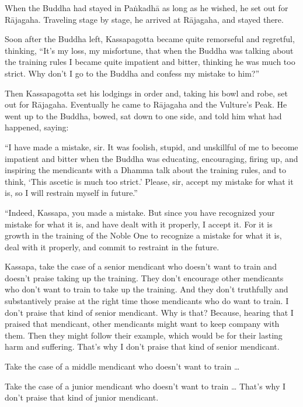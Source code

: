 \documentclass[12pt,openany]{book}%
\begin{document}
When the Buddha had stayed in \textsanskrit{Paṅkadhā} as long as he wished, he set out for \textsanskrit{Rājagaha}. Traveling stage by stage, he arrived at \textsanskrit{Rājagaha}, and stayed there. 

Soon after the Buddha left, Kassapagotta became quite remorseful and regretful, thinking, “It’s my loss, my misfortune, that when the Buddha was talking about the training rules I became quite impatient and bitter, thinking he was much too strict. Why don’t I go to the Buddha and confess my mistake to him?” 

Then Kassapagotta set his lodgings in order and, taking his bowl and robe, set out for \textsanskrit{Rājagaha}. Eventually he came to \textsanskrit{Rājagaha} and the Vulture’s Peak. He went up to the Buddha, bowed, sat down to one side, and told him what had happened, saying: 

“I have made a mistake, sir. It was foolish, stupid, and unskillful of me to become impatient and bitter when the Buddha was educating, encouraging, firing up, and inspiring the mendicants with a Dhamma talk about the training rules, and to think, ‘This ascetic is much too strict.’ Please, sir, accept my mistake for what it is, so I will restrain myself in future.” 

“Indeed, Kassapa, you made a mistake. But since you have recognized your mistake for what it is, and have dealt with it properly, I accept it. For it is growth in the training of the Noble One to recognize a mistake for what it is, deal with it properly, and commit to restraint in the future. 

Kassapa, take the case of a senior mendicant who doesn’t want to train and doesn’t praise taking up the training. They don’t encourage other mendicants who don’t want to train to take up the training. And they don’t truthfully and substantively praise at the right time those mendicants who do want to train. I don’t praise that kind of senior mendicant. Why is that? Because, hearing that I praised that mendicant, other mendicants might want to keep company with them. Then they might follow their example, which would be for their lasting harm and suffering. That’s why I don’t praise that kind of senior mendicant. 

Take the case of a middle mendicant who doesn’t want to train … 

Take the case of a junior mendicant who doesn’t want to train … That’s why I don’t praise that kind of junior mendicant. 
\end{document}

